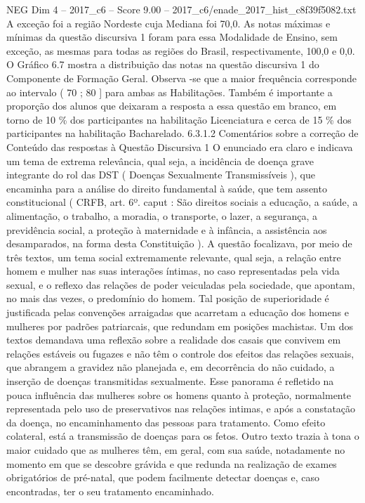 \begin{textsample}{NEG Dim 4 – 2017\_c6 – Score 9.00 – 2017\_c6/enade\_2017\_hist\_c8f39f5082.txt}
A exceção foi a região Nordeste cuja Mediana foi 70,0.
As notas máximas e mínimas da questão discursiva 1 foram para essa Modalidade de Ensino, sem exceção, as mesmas para todas as regiões do Brasil, respectivamente, 100,0 e 0,0.
O Gráfico 6.7 mostra a distribuição das notas na questão discursiva 1 do Componente de Formação Geral.
Observa -se que a maior frequência corresponde ao intervalo ( 70 ; 80 ] para ambas as Habilitações.
Também é importante a proporção dos alunos que deixaram a resposta a essa questão em branco, em torno de 10 \% dos participantes na habilitação Licenciatura e cerca de 15 \% dos participantes na habilitação Bacharelado. 6.3.1.2 Comentários sobre a correção de Conteúdo das respostas à Questão Discursiva 1 O enunciado era claro e indicava um tema de extrema relevância, qual seja, a incidência de doença grave integrante do rol das DST ( Doenças Sexualmente Transmissíveis ), que encaminha para a análise do direito fundamental à saúde, que tem assento constitucional ( CRFB, art. 6º. caput : São direitos sociais a educação, a saúde, a alimentação, o trabalho, a moradia, o transporte, o lazer, a segurança, a previdência social, a proteção à maternidade e à infância, a assistência aos desamparados, na forma desta Constituição ).
A questão focalizava, por meio de três textos, um tema social extremamente relevante, qual seja, a relação entre homem e mulher nas suas interações íntimas, no caso representadas pela vida sexual, e o reflexo das relações de poder veiculadas pela sociedade, que apontam, no mais das vezes, o predomínio do homem.
Tal posição de superioridade é justificada pelas convenções arraigadas que acarretam a educação dos homens e mulheres por padrões patriarcais, que redundam em posições machistas.
Um dos textos demandava uma reflexão sobre a realidade dos casais que convivem em relações estáveis ou fugazes e não têm o controle dos efeitos das relações sexuais, que abrangem a gravidez não planejada e, em decorrência do não cuidado, a inserção de doenças transmitidas sexualmente.
Esse panorama é refletido na pouca influência das mulheres sobre os homens quanto à proteção, normalmente representada pelo uso de preservativos nas relações intimas, e após a constatação da doença, no encaminhamento das pessoas para tratamento.
Como efeito colateral, está a transmissão de doenças para os fetos.
Outro texto trazia à tona o maior cuidado que as mulheres têm, em geral, com sua saúde, notadamente no momento em que se descobre grávida e que redunda na realização de exames obrigatórios de pré-natal, que podem facilmente detectar doenças e, caso encontradas, ter o seu tratamento encaminhado.

\end{textsample}
